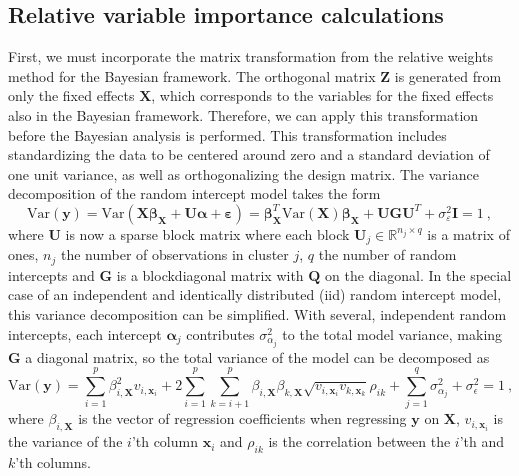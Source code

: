 \subsection{Relative variable importance calculations}
First, we must incorporate the matrix transformation from the relative weights method for the Bayesian framework.
The orthogonal matrix $\mathbf{Z}$ is generated from only the fixed effects $\mathbf{X}$, which corresponds to the variables for the fixed effects also in the Bayesian framework. Therefore, we can apply this transformation before the Bayesian analysis is performed.
This transformation includes standardizing the data to be centered around zero and a standard deviation of one unit variance, as well as orthogonalizing the design matrix.
\newline
\newline
The variance decomposition of the random intercept model takes the form
\begin{equation}
    \text{Var}(\mathbf{y}) = \text{Var}(\mathbf{X}\boldsymbol{\beta}_{\mathbf{X}} + \mathbf{U}\boldsymbol{\alpha} + \boldsymbol{\varepsilon}) = \boldsymbol{\beta}_{\mathbf{X}}^T\text{Var}(\mathbf{X})\boldsymbol{\beta}_{\mathbf{X}} + \mathbf{U}\mathbf{G}\mathbf{U}^T + \sigma_{\varepsilon}^2\mathbf{I} = 1  \ ,
    \label{eqn:Variance_random}
\end{equation}
where $\mathbf{U}$ is now a sparse block matrix where each block $\mathbf{U}_j \in \mathbb{R}^{n_j \times q}$ is a matrix of ones, $n_j$ the number of observations in cluster $j$, $q$ the number of random intercepts and $\mathbf{G}$ is a blockdiagonal matrix with $\mathbf{Q}$ on the diagonal.
In the special case of an independent and identically distributed (iid) random intercept model, this variance decomposition can be simplified.
With several, independent random intercepts, each intercept $\boldsymbol{\alpha}_j$ contributes $\sigma^2_{\alpha_j}$ to the total model variance, making $\mathbf{G}$ a diagonal matrix, so the total variance of the model can be decomposed as
\begin{equation}\label{eq:variance_theoretical_x}
    \text{Var}(\mathbf{y}) = \sum_{i=1}^p \beta_{i, \mathbf{X}}^2 v_{i, \mathbf{x}_i} + 2 \sum_{i=1}^p \sum_{k=i+1}^p \beta_{i, \mathbf{X}}\beta_{k, \mathbf{X}}\sqrt{v_{i, \mathbf{x}_i}v_{k, \mathbf{x}_k}}\rho_{ik} + \sum_{j=1}^q \sigma^2_{\alpha_j} + \sigma^2_{\epsilon} = 1 \ ,
\end{equation}
where $\beta_{i, \mathbf{X}}$ is the vector of regression coefficients when regressing $\mathbf{y}$ on $\mathbf{X}$, $v_{i, \mathbf{x}_i}$ is the variance of the $i$'th column $\mathbf{x}_i$ and $\rho_{ik}$ is the correlation between the $i$'th and $k$'th columns. 
